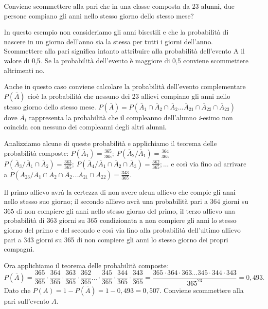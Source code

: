 \begin{esempio}
Conviene scommettere alla pari che in una classe composta da 23 alunni, due 
persone compiano gli anni nello stesso giorno dello stesso mese?

In questo esempio non consideriamo gli anni bisestili e che la probabilità di 
nascere in un giorno dell'anno sia la stessa per tutti i giorni dell'anno. 
Scommettere alla pari significa intanto attribuire alla probabilità 
dell'evento 
A il valore di 0,5. Se la probabilità dell'evento è maggiore di 0,5 conviene 
scommettere altrimenti no.

Anche in questo caso conviene calcolare la probabilità dell'evento 
complementare 
$P(\overline A)$ cioè la probabilità che nessuno dei 23 allievi compiano gli 
anni nello stesso giorno dello stesso mese. $P(\overline A)=P(\overline 
A_1\cap 
\overline A_2\cap \overline A_2\ldots \overline A_{21}\cap \overline 
A_{22}\cap 
\overline A_{23})$ dove $\overline{A_i}$ rappresenta la probabilità che il 
compleanno dell'alunno \emph{i}{}-esimo non coincida con nessuno dei 
compleanni 
degli altri alunni.

Analizziamo alcune di queste probabilità e applichiamo il teorema delle 
probabilità composte: $P(\overline A_1)=\frac{365}{365};\ P(\overline 
A_2/\overline A_1)=\frac{364}{365}$ $P(\overline A_3/\overline A_1\cap 
\overline 
A_2)=\frac{363}{365};\ P(\overline A_4/\overline A_1\cap \overline A_2\cap 
\overline A_3)=\frac{362}{365};\ldots $ e così via fino ad arrivare a 
$P(\overline A_{23}/\overline A_1\cap \overline A_2\cap \overline A_2\ldots 
\overline A_{21}\cap \overline A_{22})=\frac{343}{365}$.

Il primo allievo avrà la certezza di non avere alcun allievo che compie gli 
anni 
nello stesso suo giorno; il secondo allievo avrà una probabilità pari a 364 
giorni su 365 di non compiere gli anni nello stesso giorno del primo, il 
terzo 
allievo una probabilità di 363 giorni su 365 condizionata a non compiere gli 
anni lo stesso giorno del primo e del secondo e così via fino alla 
probabilità 
dell'ultimo allievo pari a 343 giorni su 365 di non compiere gli anni lo 
stesso 
giorno dei propri compagni.

Ora applichiamo il teorema delle probabilità composte: \[ P(\overline 
A)=\frac{365}{365}\cdot \frac{364}{365}\cdot \frac{363}{365}\cdot 
\frac{362}{365}\ldots \cdot \frac{345}{365}\cdot \frac{344}{365}\cdot 
\frac{343}{365}=\frac{365\cdot 364\cdot 363\ldots 345 \cdot 344\cdot 
343}{365^{23}}=0,493. \] Dato che $P(A)=1-P(\overline A)=1-0,493=0,507$.
\conclusione Conviene scommettere alla pari sull'evento $ A $.
\end{esempio}

